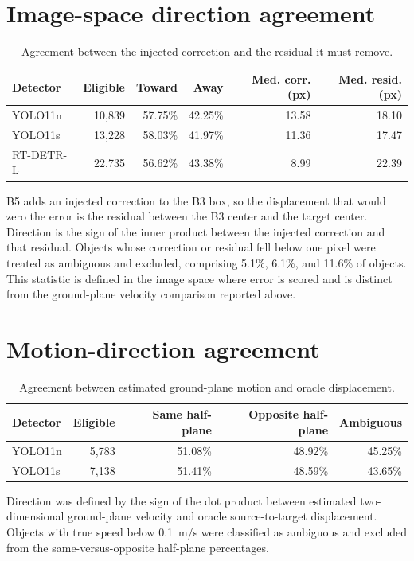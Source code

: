 \documentclass[11pt]{article}
\begin{document}
\section{Image-space direction agreement}
\begin{table}[htbp]
\centering
\caption{Agreement between the injected correction and the residual it must remove.}
\small
\begin{tabular}{lrrrrr}
\toprule
Detector & Eligible & Toward & Away & Med. corr. (px) & Med. resid. (px)\\
\midrule
YOLO11n & 10,839 & 57.75\% & 42.25\% & 13.58 & 18.10\\
YOLO11s & 13,228 & 58.03\% & 41.97\% & 11.36 & 17.47\\
RT-DETR-L & 22,735 & 56.62\% & 43.38\% & 8.99 & 22.39\\
\bottomrule
\end{tabular}
\end{table}
B5 adds an injected correction to the B3 box, so the displacement that would zero the error is the residual between the B3 center and the target center. Direction is the sign of the inner product between the injected correction and that residual. Objects whose correction or residual fell below one pixel were treated as ambiguous and excluded, comprising 5.1\%, 6.1\%, and 11.6\% of objects. This statistic is defined in the image space where error is scored and is distinct from the ground-plane velocity comparison reported above.

\section{Motion-direction agreement}
\begin{table}[htbp]
\centering
\caption{Agreement between estimated ground-plane motion and oracle displacement.}
\small
\begin{tabular}{lrrrr}
\toprule
Detector & Eligible & Same half-plane & Opposite half-plane & Ambiguous\\
\midrule
YOLO11n & 5,783 & 51.08\% & 48.92\% & 45.25\%\\
YOLO11s & 7,138 & 51.41\% & 48.59\% & 43.65\%\\
\bottomrule
\end{tabular}
\end{table}
Direction was defined by the sign of the dot product between estimated two-dimensional ground-plane velocity and oracle source-to-target displacement. Objects with true speed below 0.1~m/s were classified as ambiguous and excluded from the same-versus-opposite half-plane percentages.
\end{document}
